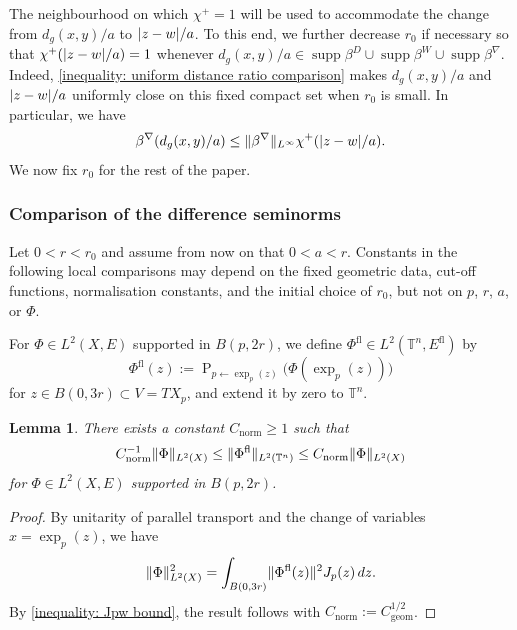 \documentclass[a4paper,oneside,12pt]{amsart}
\theoremstyle{plain}
\newtheorem{lemma}[theorem]{Lemma}
\theoremstyle{definition}
\theoremstyle{remark}
\DeclarePairedDelimiter{\abs}{\lvert}{\rvert}
\DeclarePairedDelimiter{\norm}{\lVert}{\rVert}
\DeclareMathOperator{\support}{supp}
\newcommand{\paralleltransport}[2]{\operatorname{P}_{#2 \gets #1}}
\newcommand{\flattorus}{\mathbb{T}^n}
\newcommand{\Ltwonorm}[2][L^2]{\norm{#2}_{#1}}
\newcommand{\cutoff}{\beta}
\newcommand{\cutoffDirac}{\cutoff^D}
\newcommand{\cutoffWilson}{\cutoff^W}
\newcommand{\cutoffnabla}{\cutoff^{\nabla}}
\newcommand{\cutoffupper}{\chi^+}
\newcommand{\flatmodel}[1]{#1^{\mathrm{fl}}}
\newcommand{\constantgeometric}{C_{\mathrm{geom}}}
\newcommand{\constantLtwonorm}{C_{\mathrm{norm}}}
\begin{document}
The neighbourhood on which $\cutoffupper = 1$ will be used to accommodate the change from $d_g(x,y)/a$ to $\abs{z-w}/a$.
To this end, we further decrease $r_0$ if necessary so that $\cutoffupper(\abs{z-w}/a) = 1$ whenever $d_g(x,y)/a \in \support \cutoffDirac \cup \support \cutoffWilson \cup \support \cutoffnabla$.
Indeed, \eqref{inequality: uniform distance ratio comparison} makes $d_g(x,y)/a$ and $\abs{z-w}/a$ uniformly close on this fixed compact set when $r_0$ is small.
In particular, we have
\begin{equation}\label{inequality: cutoff comparison}
  \cutoffnabla(d_g(x,y)/a) \le \norm{\cutoffnabla}_{L^{\infty}} \cutoffupper(\abs{z-w}/a).
\end{equation}
We now fix $r_0$ for the rest of the paper.

\subsubsection{Comparison of the difference seminorms}

Let $0 < r < r_0$ and assume from now on that $0 < a < r$.
Constants in the following local comparisons may depend on the fixed geometric data, cut-off functions, normalisation constants, and the initial choice of $r_0$, but not on $p$, $r$, $a$, or $\Phi$.

For $\Phi \in L^2(X,E)$ supported in $B(p,2r)$, we define $\flatmodel{\Phi} \in L^2(\flattorus, \flatmodel{E})$ by
\begin{equation}
  \flatmodel{\Phi}(z) := \paralleltransport{\exp_p(z)}{p}\big(\Phi(\exp_p(z))\big)
\end{equation}
for $z \in B(0,3r) \subset V = TX_p$, and extend it by zero to $\flattorus$.

\begin{lemma}\label{lemma: Ltwo norm comparison}
  There exists a constant $\constantLtwonorm \ge 1$ such that
  \begin{equation}\label{inequality: comparison of L2 norms}
    \constantLtwonorm^{-1} \Ltwonorm[L^2(X)]{\Phi} \le \Ltwonorm[L^2(\flattorus)]{\flatmodel{\Phi}} \le \constantLtwonorm \Ltwonorm[L^2(X)]{\Phi}
  \end{equation}
  for $\Phi \in L^2(X,E)$ supported in $B(p,2r)$.
\end{lemma}
\begin{proof}
  By unitarity of parallel transport and the change of variables $x=\exp_p(z)$, we have
  \begin{equation}
    \Ltwonorm[L^2(X)]{\Phi}^2 = \int_{B(0,3r)} \norm{\flatmodel{\Phi}(z)}^2 J_p(z)\,dz.
  \end{equation}
  By \eqref{inequality: Jpw bound}, the result follows with $\constantLtwonorm := \constantgeometric^{1/2}$.
\end{proof}
\end{document}
